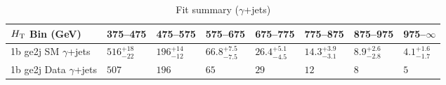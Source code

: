 \documentclass[8pt]{article}
\def\scalht{\mbox{$H_{\rm{T}}$}\xspace}
\newcommand\T{\rule{0pt}{2.6ex}}
\begin{document}
\begin{table}[ht!]
\caption{Fit summary ($\gamma$+jets)}
\label{tab:ensemble-summary}
\centering
\begin{tabular}{ llllllll }

\hline
\scalht Bin (GeV)       & 375--475                       & 475--575                       & 575--675                       & 675--775                       & 775--875                       & 875--975                       & 975--$\infty$                  \\ [1.000000ex]
\hline
1b ge2j SM $\gamma$+jets\T & $516^{+18}_{-22}$              & $196^{+14}_{-12}$              & $66.8^{+7.5}_{-7.5}$           & $26.4^{+5.1}_{-4.5}$           & $14.3^{+3.9}_{-3.1}$           & $8.9^{+2.6}_{-2.8}$            & $4.1^{+1.6}_{-1.7}$            \\ 
1b ge2j Data $\gamma$+jets\T & $507$                          & $196$                          & $65$                           & $29$                           & $12$                           & $8$                            & $5$                            \\ 
\hline

\end{tabular}
\end{table}
\end{document}
